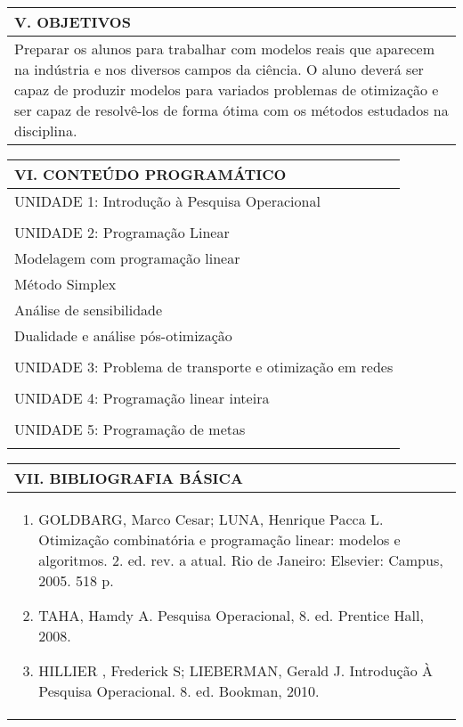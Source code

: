 \documentclass[12pt]{article}
\begin{document}
\begin{longtable}{|L{1.025\textwidth}|} \hline
%
{\bf V. OBJETIVOS } \\ \hline
%
Preparar os alunos para trabalhar com modelos reais que aparecem na indústria e nos diversos campos da ciência. O aluno deverá ser capaz de produzir modelos para variados problemas de otimização e ser capaz de resolvê-los de forma ótima com os métodos estudados na disciplina.
\\ \hline
\end{longtable}


\begin{longtable}{|L{1.025\textwidth}|} \hline
%
{\bf VI. CONTEÚDO PROGRAMÁTICO } \\ \hline
UNIDADE 1: Introdução à Pesquisa Operacional\\
\\
UNIDADE 2: Programação Linear\\
Modelagem com programação linear\\
Método Simplex \\
Análise de sensibilidade\\
Dualidade e análise pós-otimização\\
\\
UNIDADE 3: Problema de transporte e otimização em redes\\
\\
UNIDADE 4: Programação linear inteira\\
\\
UNIDADE 5: Programação de metas\\

\\ \hline
\end{longtable} 


\begin{longtable}{|L{1.025\textwidth}|} \hline
%
{\bf VII. BIBLIOGRAFIA BÁSICA} \\ \hline
\begin{enumerate}
%
\item GOLDBARG, Marco Cesar; LUNA, Henrique Pacca L. Otimização combinatória e programação linear: modelos e algoritmos. 2. ed. rev. a atual. Rio de Janeiro: Elsevier: Campus, 2005. 518 p. 
\item TAHA, Hamdy A. Pesquisa Operacional, 8. ed. Prentice Hall, 2008. 
\item HILLIER , Frederick S; LIEBERMAN, Gerald J. Introdução À Pesquisa Operacional. 8. ed. Bookman, 2010.
\end{enumerate}
 \\ \hline
\end{longtable}
\end{document}

